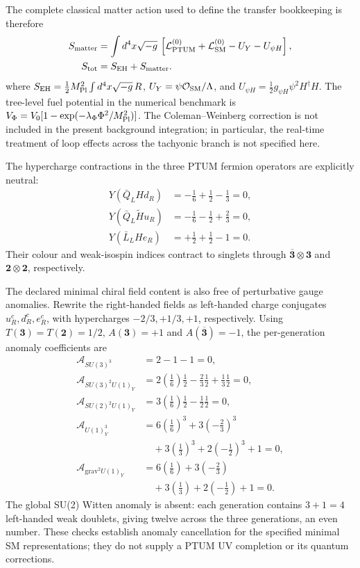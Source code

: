 \documentclass[epj]{svjour}
\begin{document}
The complete classical matter action used to define the transfer
bookkeeping is therefore
\begin{align}
S_{\rm matter}&=\int d^4x\sqrt{-g}\,
\left[
\mathcal L_{\rm PTUM}^{(0)}
+\mathcal L_{\rm SM}^{(0)}
-U_Y-U_{\psi H}
\right],\nonumber\\
S_{\rm tot}&=S_{\rm EH}+S_{\rm matter}.
\end{align}
where
\(S_{\rm EH}=\tfrac12M_{\rm Pl}^2\int d^4x\sqrt{-g}\,R\),
\(U_Y=\psi\mathcal O_{\rm SM}/\Lambda\), and
\(U_{\psi H}=\tfrac12g_{\psi H}\psi^2H^\dagger H\).
The tree-level fuel potential in the numerical benchmark is
\(V_\Phi=V_0[1-\exp(-\lambda_\Phi\Phi^2/M_{\rm Pl}^2)]\).
The Coleman--Weinberg correction is not included in the present
background integration; in particular, the real-time treatment of
loop effects across the tachyonic branch is not specified here.

The hypercharge contractions in the three PTUM fermion operators
are explicitly neutral:
\begin{align}
Y(\bar Q_L H d_R)&=-\tfrac16+\tfrac12-\tfrac13=0,\nonumber\\
Y(\bar Q_L\widetilde H u_R)&=-\tfrac16-\tfrac12+\tfrac23=0,\nonumber\\
Y(\bar L_L H e_R)&=+\tfrac12+\tfrac12-1=0.
\end{align}
Their colour and weak-isospin indices contract to singlets through
\(\overline{\mathbf3}\otimes\mathbf3\) and
\(\mathbf2\otimes\mathbf2\), respectively.

The declared minimal chiral field content is also free of perturbative
gauge anomalies. Rewrite the right-handed fields as left-handed charge
conjugates \(u_R^c,d_R^c,e_R^c\), with hypercharges
\(-2/3,+1/3,+1\), respectively. Using
\(T(\mathbf3)=T(\mathbf2)=1/2\),
\(A(\mathbf3)=+1\) and \(A(\overline{\mathbf3})=-1\), the
per-generation anomaly coefficients are
\begin{align}
\mathcal A_{SU(3)^3}
&=2-1-1=0,\nonumber\\
\mathcal A_{SU(3)^2U(1)_Y}
&=2\left(\frac16\right)\frac12
-\frac23\frac12+\frac13\frac12=0,\nonumber\\
\mathcal A_{SU(2)^2U(1)_Y}
&=3\left(\frac16\right)\frac12
-\frac12\frac12=0,\nonumber\\
\mathcal A_{U(1)_Y^3}
&=6\left(\frac16\right)^3+3\left(-\frac23\right)^3\nonumber\\
&\quad+3\left(\frac13\right)^3
+2\left(-\frac12\right)^3+1=0,\nonumber\\
\mathcal A_{\mathrm{grav}^2U(1)_Y}
&=6\left(\frac16\right)+3\left(-\frac23\right)\nonumber\\
&\quad+3\left(\frac13\right)+2\left(-\frac12\right)+1=0.
\label{eq:sm_gauge_anomaly_cancellation}
\end{align}
The global SU(2) Witten anomaly is absent: each generation contains
\(3+1=4\) left-handed weak doublets, giving twelve across the three
generations, an even number. These checks establish anomaly
cancellation for the specified minimal SM representations; they do
not supply a PTUM UV completion or its quantum corrections.
\end{document}
